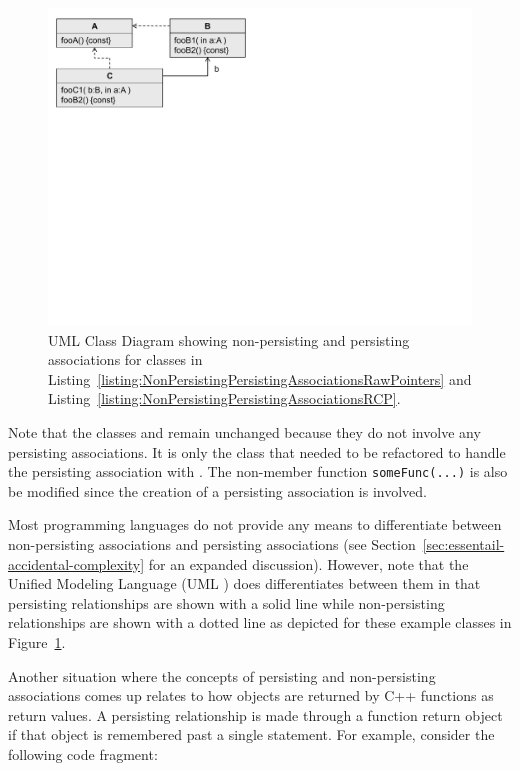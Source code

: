 \documentclass[pdf,ps2pdf,11pt]{SANDreport}
\begin{document}
{\bsinglespace
\begin{figure}
\begin{center}
\includegraphics*[angle=0,scale=0.65]{UML_A_B_C}
\end{center}
\caption[UML Class Diagram showing non-persisting and persisting associations]{
\label{fig:UML_A_B_C}
UML Class Diagram showing non-persisting and persisting associations
for classes in
Listing~\ref{listing:NonPersistingPersistingAssociationsRawPointers}
and Listing~\ref{listing:NonPersistingPersistingAssociationsRCP}.}
\end{figure}
\esinglespace}


Note that the classes {} and {} remain unchanged because
they do not involve any persisting associations.  It is only the class
{} that needed to be refactored to handle the persisting
association with {}.  The non-member function
{}\texttt{someFunc(...)} is also be modified since the creation of a
persisting association is involved.

Most programming languages do not provide any means to differentiate
between non-persisting associations and persisting associations (see
Section~\ref{sec:essentail-accidental-complexity} for an expanded
discussion).  However, note that the Unified Modeling Language (UML
{}\cite{UMLDistilledThirdEdition04}) does differentiates between them
in that persisting relationships are shown with a solid line while
non-persisting relationships are shown with a dotted line as depicted
for these example classes in Figure~\ref{fig:UML_A_B_C}.

Another situation where the concepts of persisting and non-persisting
associations comes up relates to how objects are returned by C++ functions as
return values.  A persisting relationship is made through a function return
object if that object is remembered past a single statement.  For example,
consider the following code fragment:
\end{document}

